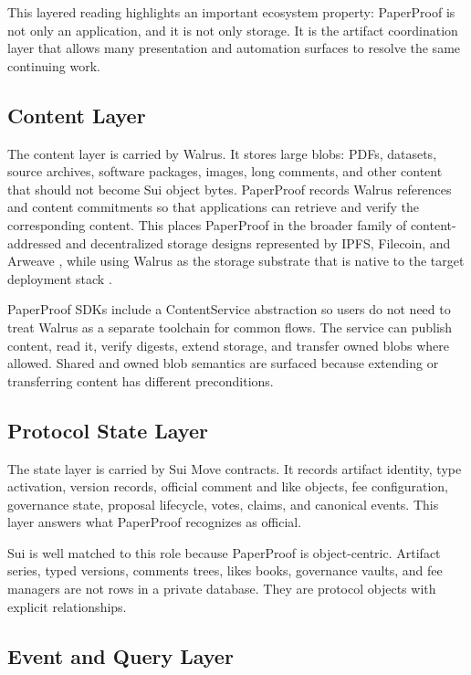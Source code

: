 \documentclass[journal]{IEEEtran}
\begin{document}
This layered reading highlights an important ecosystem property: PaperProof is
not only an application, and it is not only storage. It is the artifact
coordination layer that allows many presentation and automation surfaces to
resolve the same continuing work.

\subsection{Content Layer}

The content layer is carried by Walrus. It stores large blobs: PDFs, datasets, source archives, software packages, images, long comments, and other content that should not become Sui object bytes. PaperProof records Walrus references and content commitments so that applications can retrieve and verify the corresponding content. This places PaperProof in the broader family of content-addressed and decentralized storage designs represented by IPFS, Filecoin, and Arweave \cite{benet2014ipfs,protocol_labs2017filecoin,williams2023arweave}, while using Walrus as the storage substrate that is native to the target deployment stack \cite{danezis2025walrus,walrus_docs}.

PaperProof SDKs include a ContentService abstraction so users do not need to treat Walrus as a separate toolchain for common flows. The service can publish content, read it, verify digests, extend storage, and transfer owned blobs where allowed. Shared and owned blob semantics are surfaced because extending or transferring content has different preconditions.

\subsection{Protocol State Layer}

The state layer is carried by Sui Move contracts. It records artifact identity, type activation, version records, official comment and like objects, fee configuration, governance state, proposal lifecycle, votes, claims, and canonical events. This layer answers what PaperProof recognizes as official.

Sui is well matched to this role because PaperProof is object-centric. Artifact series, typed versions, comments trees, likes books, governance vaults, and fee managers are not rows in a private database. They are protocol objects with explicit relationships.

\subsection{Event and Query Layer}
\end{document}
